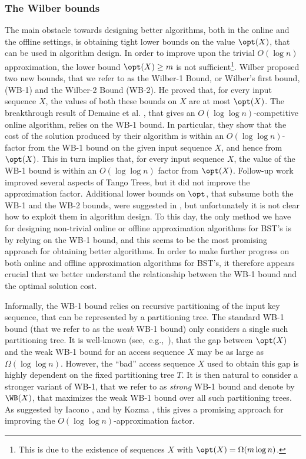 \subsubsection{The Wilber bounds} 

The main obstacle towards designing better algorithms, both in the online and the offline settings, is  obtaining tight lower bounds on the value $\opt(X)$, that can be used in algorithm design. 
%
%
%
In order to improve upon the trivial $O(\log n)$ approximation, the lower bound $\opt(X) \geq m$ is not sufficient\footnote{This is due to the existence of sequences $X$ with $\opt(X) = \Omega(m \log n)$.}. 
Wilber \cite{wilber} proposed two new bounds, that we refer to as the  Wilber-1 Bound, or Wilber's first bound, (WB-1) and the Wilber-2
Bound (WB-2). 
He proved that, for every input sequence $X$, the values of both these bounds on $X$ are at most $\opt(X)$. %
%
The breakthrough result of 
%
Demaine et al. \cite{tango}, that gives
an $O(\log\log n)$-competitive online algorithm, relies on the WB-1 bound. In particular, they show that the cost of the solution produced by their algorithm is within an $O(\log\log n)$-factor from the
WB-1 bound on the given input sequence $X$, and hence from $\opt(X)$. This in turn implies that, for every input sequence $X$, the value of the WB-1 bound is within an $O(\log\log n)$ factor from $\opt(X)$. Follow-up work \cite{multisplay,chain_splay} improved several
aspects of Tango Trees, but it did not improve the approximation factor. Additional lower bounds on $\opt$, that subsume both the WB-1 and the WB-2 bounds, were suggested in \cite{DHIKP09,DSW,Harmon}, but unfortunately it is not clear how to exploit them in algorithm design. %
To this day, the only method we have for designing non-trivial online or offline approximation algorithms for BST's is by relying on the WB-1 bound, and this seems to be the most promising approach for obtaining better algorithms.
In order to make further progress on both online and offline approximation algorithms for BST's, it therefore appears crucial that we better understand the relationship between the WB-1 bound and the optimal solution cost. 

Informally, the WB-1 bound relies on recursive partitioning of the input key sequence, that  can be represented by a partitioning tree. The standard WB-1 bound (that we refer to as the \emph{weak} WB-1 bound)  only considers a single such partitioning tree. It is well-known (see,~e.g.,~\cite{tango,multisplay,in_pursuit}), that the gap between $\opt(X)$
and the weak WB-1 bound for an access sequence $X$ may be as large as  $\Omega(\log\log n)$.  
However, the ``bad'' access sequence $X$ used to obtain this gap is highly dependent on the fixed partitioning tree $T$. It is then natural to consider a stronger variant of WB-1, that we refer to as \emph{strong} WB-1 bound and denote by $\WB(X)$, that maximizes the weak WB-1 bound over all such partitioning trees.
As suggested by  Iacono \cite{in_pursuit}, and by Kozma \cite{Kozma16_thesis}, this gives a promising approach for improving the $O(\log\log n)$-approximation factor. 

